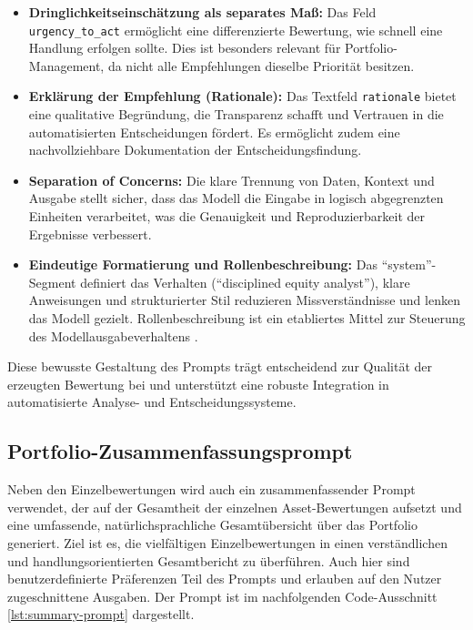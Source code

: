 \begin{itemize}
        \item \textbf{Dringlichkeitseinschätzung als separates Maß:} Das Feld \texttt{urgency\_to\_act} ermöglicht eine differenzierte Bewertung, wie schnell eine Handlung erfolgen sollte.
        Dies ist besonders relevant für Portfolio-Management, da nicht alle Empfehlungen dieselbe Priorität besitzen.

        \item \textbf{Erklärung der Empfehlung (Rationale):} Das Textfeld \texttt{rationale} bietet eine qualitative Begründung, die Transparenz schafft und Vertrauen in die automatisierten Entscheidungen fördert.
        Es ermöglicht zudem eine nachvollziehbare Dokumentation der Entscheidungsfindung.

        \item \textbf{Separation of Concerns:} Die klare Trennung von Daten, Kontext und Ausgabe stellt sicher, dass das Modell die Eingabe in logisch abgegrenzten Einheiten verarbeitet, was die Genauigkeit und Reproduzierbarkeit der Ergebnisse verbessert. \autocite{promtingguide}

        \item \textbf{Eindeutige Formatierung und Rollenbeschreibung:} Das \enquote{system}-Segment definiert das Verhalten (\enquote{disciplined equity analyst}), klare Anweisungen und strukturierter Stil reduzieren Missverständnisse und lenken das Modell gezielt. Rollenbeschreibung ist ein etabliertes Mittel zur Steuerung des Modellausgabeverhaltens \autocite{promtingguide}.

      \end{itemize}

      Diese bewusste Gestaltung des Prompts trägt entscheidend zur Qualität der erzeugten Bewertung bei und unterstützt eine robuste Integration in automatisierte Analyse- und Entscheidungssysteme.

      \subsection{Portfolio-Zusammenfassungsprompt}
        \label{sec:prompt-portfolio}

        Neben den Einzelbewertungen wird auch ein zusammenfassender Prompt verwendet, der auf der Gesamtheit der einzelnen Asset-Bewertungen aufsetzt und eine umfassende, natürlichsprachliche Gesamtübersicht über das Portfolio generiert.
        Ziel ist es, die vielfältigen Einzelbewertungen in einen verständlichen und handlungsorientierten Gesamtbericht zu überführen.
        Auch hier sind benutzerdefinierte Präferenzen Teil des Prompts und erlauben auf den Nutzer zugeschnittene Ausgaben.
        Der Prompt ist im nachfolgenden Code-Ausschnitt \ref{lst:summary-prompt} dargestellt.

